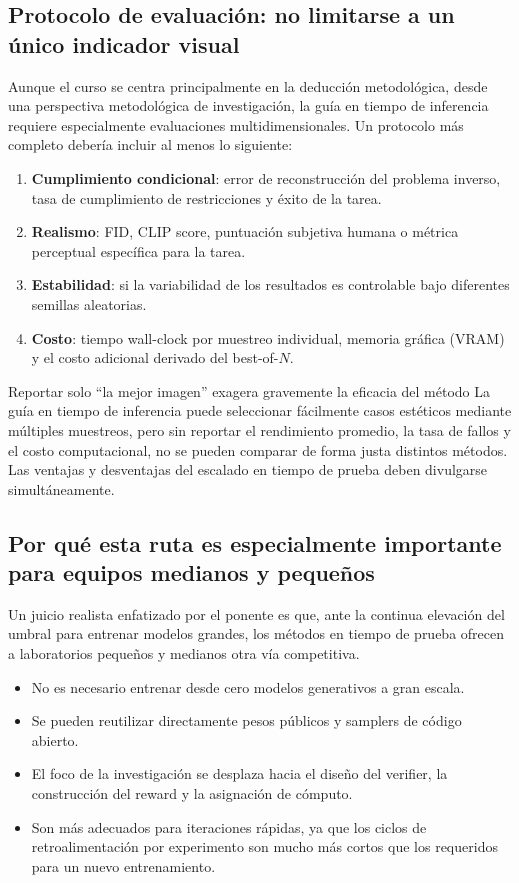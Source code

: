 \documentclass[a4paper]{article}
\begin{document}
\subsection{Protocolo de evaluación: no limitarse a un único indicador visual}

Aunque el curso se centra principalmente en la deducción metodológica, desde una perspectiva metodológica de investigación, la guía en tiempo de inferencia requiere especialmente evaluaciones multidimensionales. Un protocolo más completo debería incluir al menos lo siguiente:

\begin{enumerate}
    \item \textbf{Cumplimiento condicional}: error de reconstrucción del problema inverso, tasa de cumplimiento de restricciones y éxito de la tarea.
    \item \textbf{Realismo}: FID, CLIP score, puntuación subjetiva humana o métrica perceptual específica para la tarea.
    \item \textbf{Estabilidad}: si la variabilidad de los resultados es controlable bajo diferentes semillas aleatorias.
    \item \textbf{Costo}: tiempo wall-clock por muestreo individual, memoria gráfica (VRAM) y el costo adicional derivado del best-of-$N$.
\end{enumerate}

\begin{warningbox}{Reportar solo ``la mejor imagen'' exagera gravemente la eficacia del método}
La guía en tiempo de inferencia puede seleccionar fácilmente casos estéticos mediante múltiples muestreos, pero sin reportar el rendimiento promedio, la tasa de fallos y el costo computacional, no se pueden comparar de forma justa distintos métodos. Las ventajas y desventajas del escalado en tiempo de prueba deben divulgarse simultáneamente.
\end{warningbox}

\subsection{Por qué esta ruta es especialmente importante para equipos medianos y pequeños}

Un juicio realista enfatizado por el ponente es que, ante la continua elevación del umbral para entrenar modelos grandes, los métodos en tiempo de prueba ofrecen a laboratorios pequeños y medianos otra vía competitiva.

\begin{itemize}
    \item No es necesario entrenar desde cero modelos generativos a gran escala.
    \item Se pueden reutilizar directamente pesos públicos y samplers de código abierto.
    \item El foco de la investigación se desplaza hacia el diseño del verifier, la construcción del reward y la asignación de cómputo.
    \item Son más adecuados para iteraciones rápidas, ya que los ciclos de retroalimentación por experimento son mucho más cortos que los requeridos para un nuevo entrenamiento.
\end{itemize}
\end{document}
